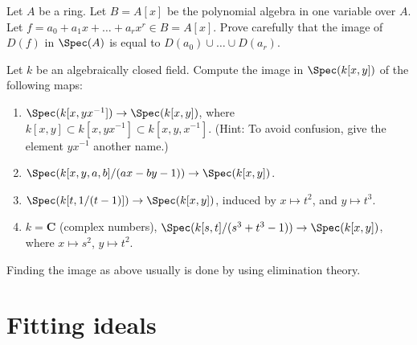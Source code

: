 \begin{exercise}
\label{exercise-image}
Let $A$ be a ring. Let $B = A[x]$ be the polynomial algebra in
one variable over $A$. Let $f = a_0 + a_1 x + \ldots + a_r x^r \in B = A[x]$.
Prove carefully that the image of $D(f)$ in $\Spec(A)$ is equal to
$D(a_0) \cup \ldots \cup D(a_r)$.
\end{exercise}

\begin{exercise}
\label{exercise-images}
Let $k$ be an algebraically closed field. Compute the image in
$\Spec(k[x, y])$
of the following maps:
\begin{enumerate}
\item $\Spec(k[x, yx^{-1}]) \to \Spec(k[x, y])$, where
$k[x, y] \subset k[x, yx^{-1}] \subset k[x, y, x^{-1}]$.
(Hint: To avoid confusion, give the element $yx^{-1}$ another name.)
\item $\Spec(k[x, y, a, b]/(ax-by-1))\to \Spec(k[x, y])$.
\item $\Spec(k[t, 1/(t-1)]) \to \Spec(k[x, y])$, induced by $x
\mapsto t^2$,
and $y \mapsto t^3$.
\item $k = {\mathbf C}$ (complex numbers),
$\Spec(k[s, t]/(s^3 + t^3-1)) \to \Spec(k[x, y])$, where
$x\mapsto s^2$, $y \mapsto t^2$.
\end{enumerate}
\end{exercise}

\begin{remark}
\label{remark-elimination-theory}
Finding the image as above usually is done by using elimination theory.
\end{remark}




\section{Fitting ideals}
\label{section-fitting-ideals}

